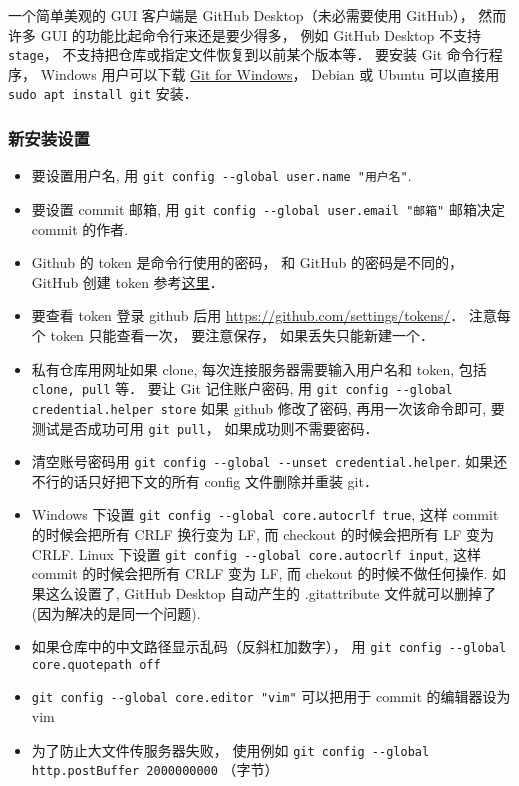 

一个简单美观的 GUI 客户端是 GitHub Desktop（未必需要使用 GitHub）， 然而许多 GUI 的功能比起命令行来还是要少得多， 例如 GitHub Desktop 不支持 \verb|stage|， 不支持把仓库或指定文件恢复到以前某个版本等． 要安装 Git 命令行程序， Windows 用户可以下载 \href{https://gitforwindows.org/}{Git for Windows}， Debian 或 Ubuntu 可以直接用 \verb|sudo apt install git| 安装．

\subsubsection{新安装设置}
\begin{itemize}
\item 要设置用户名, 用 \verb|git config --global user.name "用户名"|.
\item 要设置 commit 邮箱, 用 \verb|git config --global user.email "邮箱"|  邮箱决定 commit 的作者.
\item Github 的 token 是命令行使用的密码， 和 GitHub 的密码是不同的， GitHub 创建 token 参考\href{https://docs.github.com/en/github/authenticating-to-github/keeping-your-account-and-data-secure/creating-a-personal-access-token#creating-a-token}{这里}．
\item 要查看 token 登录 github 后用 \href{https://github.com/settings/tokens/}{https://github.com/settings/tokens/}． 注意每个 token 只能查看一次， 要注意保存， 如果丢失只能新建一个．
\item 私有仓库用网址如果 clone, 每次连接服务器需要输入用户名和 token, 包括 \verb|clone, pull| 等． 要让 Git 记住账户密码, 用 \verb|git config --global credential.helper store| 如果 github 修改了密码, 再用一次该命令即可, 要测试是否成功可用 \verb|git pull|， 如果成功则不需要密码．
\item 清空账号密码用 \verb|git config --global --unset credential.helper|. 如果还不行的话只好把下文的所有 config 文件删除并重装 git．
\item Windows 下设置 \verb|git config --global core.autocrlf true|, 这样 commit 的时候会把所有 CRLF 换行变为 LF, 而 checkout 的时候会把所有 LF 变为 CRLF. Linux 下设置 \verb|git config --global core.autocrlf input|, 这样 commit 的时候会把所有 CRLF 变为 LF, 而 chekout 的时候不做任何操作. 如果这么设置了, GitHub Desktop 自动产生的 .gitattribute 文件就可以删掉了 (因为解决的是同一个问题).
\item 如果仓库中的中文路径显示乱码（反斜杠加数字）， 用 \verb|git config --global core.quotepath off|
\item \verb|git config --global core.editor "vim"| 可以把用于 commit 的编辑器设为 vim
\item 为了防止大文件传服务器失败， 使用例如 \verb|git config --global http.postBuffer 2000000000| （字节）
\end{itemize}

